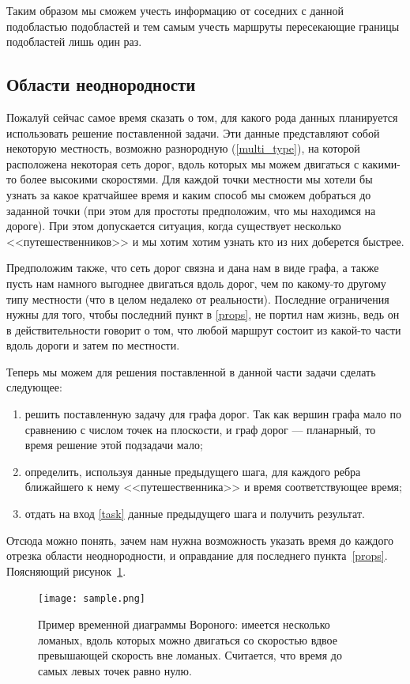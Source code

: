 \documentclass[12pt]{article}
\begin{document}
Таким образом мы сможем учесть информацию от соседних с данной подобластью
подобластей и тем самым учесть маршруты пересекающие границы подобластей лишь один раз.

\subsection{Области неоднородности}
Пожалуй сейчас самое время сказать о том, для какого рода данных планируется
использовать решение поставленной задачи. Эти данные представляют собой
некоторую местность, возможно разнородную (\ref{multi_type}), на которой
расположена некоторая сеть дорог, вдоль которых мы можем двигаться с какими-то
более высокими скоростями. Для каждой точки местности мы хотели бы узнать за
какое кратчайшее время и каким способ мы сможем добраться до заданной точки
(при этом для простоты предположим, что мы находимся на дороге). При этом
допускается ситуация, когда существует несколько  <<путешественников>> и мы
хотим хотим узнать кто из них доберется быстрее. 

Предположим также, что сеть дорог связна и дана нам в виде графа, а также пусть
нам намного выгоднее двигаться вдоль дорог, чем по какому-то другому типу
местности (что в целом недалеко от реальности). Последние ограничения нужны для
того, чтобы  последний пункт в \ref{props}, не портил нам жизнь, ведь он в
действительности говорит о том, что любой маршрут состоит из какой-то  части
вдоль дороги и затем по местности. 

Теперь мы можем для решения поставленной в данной части задачи сделать следующее:
\begin{enumerate}
\item решить поставленную задачу для графа дорог. Так как вершин графа мало 
по сравнению с числом точек на плоскости, и граф дорог --- планарный, то время 
решение этой подзадачи мало;
\item определить, используя данные предыдущего шага, для каждого ребра 
ближайшего к нему <<путешественника>> и время соответствующее время;
\item отдать на вход \ref{task} данные предыдущего шага и получить результат.
\end{enumerate}

Отсюда можно понять, зачем нам нужна возможность указать время до каждого
отрезка области неоднородности, и оправдание для последнего пункта~\ref{props}.
Поясняющий рисунок~\ref{task_fig}.

\begin{figure}
\center\texttt{[image: sample.png]}
\caption{Пример временной диаграммы Вороного: имеется несколько ломаных,
вдоль которых можно двигаться со скоростью вдвое превышающей скорость вне
ломаных. Считается, что время до самых левых точек равно нулю.}
\label{task_fig}
\end{figure}
\end{document}
